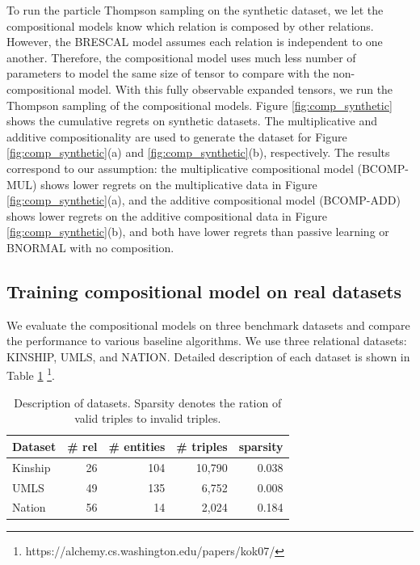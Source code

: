 To run the particle Thompson sampling on the synthetic dataset, we let the 
compositional models know which relation is composed by other relations. 
However, the BRESCAL model assumes each relation is independent to one another. 
Therefore, the compositional model uses much less number of parameters to model 
the same size of tensor to compare with the non-compositional model. 
With this fully observable expanded tensors, we run the Thompson sampling of 
the compositional models.
Figure \ref{fig:comp_synthetic} shows the cumulative regrets on synthetic 
datasets. The multiplicative and additive compositionality are used to 
generate the dataset for Figure \ref{fig:comp_synthetic}(a) and 
\ref{fig:comp_synthetic}(b), respectively. The results correspond to our 
assumption: the multiplicative compositional model (BCOMP-MUL) shows lower 
regrets on the multiplicative data in Figure \ref{fig:comp_synthetic}(a), and 
the additive compositional model (BCOMP-ADD) shows lower regrets on the 
additive compositional data in Figure \ref{fig:comp_synthetic}(b), 
and both have lower regrets than passive learning or BNORMAL with no composition. 

\subsection{Training compositional model on real datasets}
We evaluate the compositional models on three benchmark datasets and compare the performance to various baseline 
algorithms. We use three relational datasets: KINSHIP, UMLS, and NATION. Detailed description of each 
dataset is shown in Table \ref{tbl:dataset} \footnote{https://alchemy.cs.washington.edu/papers/kok07/}.

\begin{table}[t]
\centering
\caption{\label{tbl:dataset}Description of datasets. 
Sparsity denotes the ration of valid triples to invalid triples.}
\vskip 0.15in
\begin{tabular}{l | r | r | r | r}
Dataset &  \# rel & \# entities & \# triples & sparsity \\ \hline
Kinship & 26 & 104  & 10,790 & 0.038 \\
UMLS & 49 &135  & 6,752 & 0.008 \\
Nation & 56 & 14  & 2,024 & 0.184 \\
\end{tabular}
\end{table}


